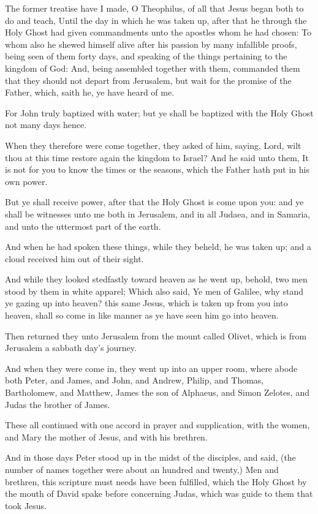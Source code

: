\Chapter
\Verse The former treatise have I made, O Theophilus, of all that Jesus began both to do and teach, \Verse Until the day in which he was taken up, after that he through the Holy Ghost had given commandments unto the apostles whom he had chosen: \Verse To whom also he shewed himself alive after his passion by many infallible proofs, being seen of them forty days, and speaking of the things pertaining to the kingdom of God: \Verse And, being assembled together with them, commanded them that they should not depart from Jerusalem, but wait for the promise of the Father, which, saith he, ye have heard of me.

\Verse For John truly baptized with water; but ye shall be baptized with the Holy Ghost not many days hence.

\Verse When they therefore were come together, they asked of him, saying, Lord, wilt thou at this time restore again the kingdom to Israel?  \Verse And he said unto them, It is not for you to know the times or the seasons, which the Father hath put in his own power.

\Verse But ye shall receive power, after that the Holy Ghost is come upon you: and ye shall be witnesses unto me both in Jerusalem, and in all Judaea, and in Samaria, and unto the uttermost part of the earth.

\Verse And when he had spoken these things, while they beheld, he was taken up; and a cloud received him out of their sight.

\Verse And while they looked stedfastly toward heaven as he went up, behold, two men stood by them in white apparel; \Verse Which also said, Ye men of Galilee, why stand ye gazing up into heaven? this same Jesus, which is taken up from you into heaven, shall so come in like manner as ye have seen him go into heaven.

\Verse Then returned they unto Jerusalem from the mount called Olivet, which is from Jerusalem a sabbath day's journey.

\Verse And when they were come in, they went up into an upper room, where abode both Peter, and James, and John, and Andrew, Philip, and Thomas, Bartholomew, and Matthew, James the son of Alphaeus, and Simon Zelotes, and Judas the brother of James.

\Verse These all continued with one accord in prayer and supplication, with the women, and Mary the mother of Jesus, and with his brethren.

\Verse And in those days Peter stood up in the midst of the disciples, and said, (the number of names together were about an hundred and twenty,) \Verse Men and brethren, this scripture must needs have been fulfilled, which the Holy Ghost by the mouth of David spake before concerning Judas, which was guide to them that took Jesus.

